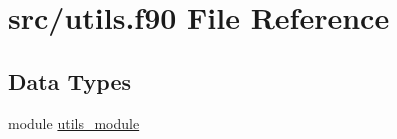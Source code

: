 \hypertarget{utils_8f90}{\section{src/utils.f90 File Reference}
\label{utils_8f90}
}
\subsection*{Data Types}
\begin{DoxyCompactItemize}
\item 
module \hyperlink{classutils__module}{utils\-\_\-module}
\end{DoxyCompactItemize}
